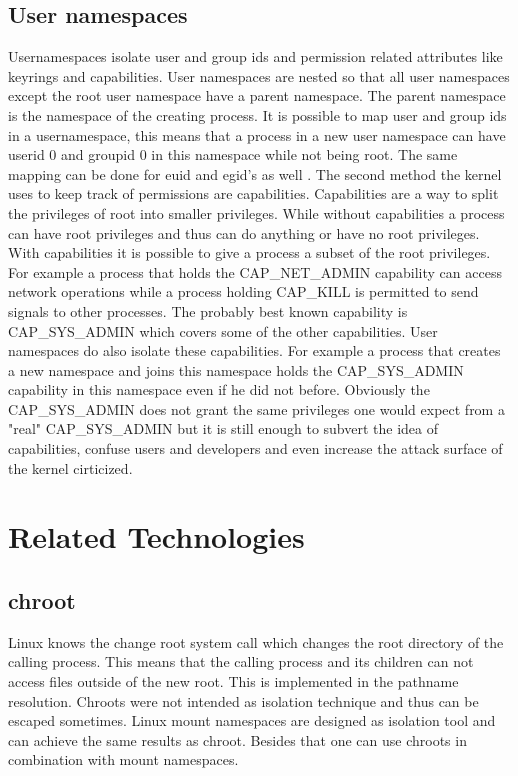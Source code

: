 \documentclass[10pt,twocolumn,a4paper]{article}
\begin{document}
\subsection{User namespaces}
Usernamespaces isolate user and group ids and permission related attributes like keyrings and
capabilities. User namespaces are nested so that all user namespaces except the root user namespace
have a parent namespace. The parent namespace is the namespace of the creating process. 
It is possible to map user and group ids in a usernamespace, this means that a process in a new user
namespace can have userid 0 and groupid 0 in this namespace while not being root. The same mapping
can be done for euid and egid's as well \cite{18}. The second method the kernel uses to keep track
of permissions are capabilities. Capabilities are a way to split the privileges of root into smaller
privileges. While without capabilities a process can have root privileges and thus can do anything
or have no root privileges. With capabilities it is possible to give a process a subset of the root
privileges. For example a process that holds the CAP\_NET\_ADMIN capability can access network
operations while a process holding CAP\_KILL is permitted to send signals to other
processes\cite{19}. The probably best known capability is CAP\_SYS\_ADMIN which covers some of the
other capabilities. 
User namespaces do also isolate these capabilities. For example a process that creates a new
namespace and joins this namespace holds the CAP\_SYS\_ADMIN capability in this namespace even if he
did not before. Obviously the CAP\_SYS\_ADMIN does not grant the same privileges one would expect from
a "real" CAP\_SYS\_ADMIN but it is still enough to subvert the idea of capabilities, confuse users and
developers and even increase the attack surface of the kernel cirticized\cite{20}. 


\section{Related Technologies}\label{sec:related}
\subsection{chroot}
Linux knows the change root system call which changes the root directory of the calling
process. This means that the calling process and its children can not access files outside of the
new root. This is implemented in the pathname resolution\cite{1}. Chroots were not intended as
isolation technique and thus can be escaped sometimes. Linux mount namespaces are
designed as isolation tool and can achieve the same results as chroot. Besides that one can use
chroots in combination with mount namespaces. %
\end{document}
